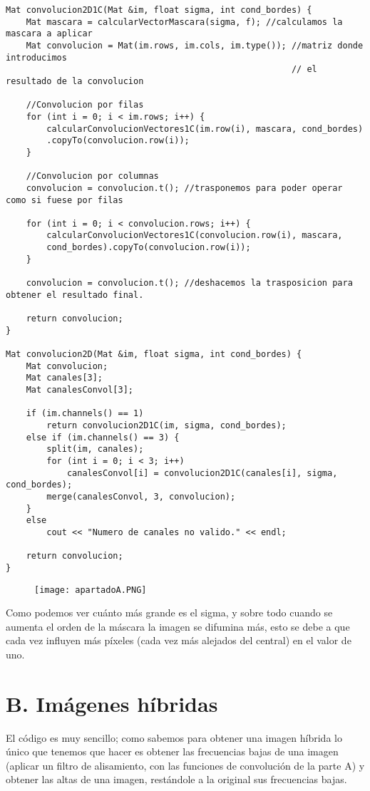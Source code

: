\documentclass[10pt,a4paper]{article}
\begin{document}
\begin{lstlisting}
Mat convolucion2D1C(Mat &im, float sigma, int cond_bordes) {
	Mat mascara = calcularVectorMascara(sigma, f); //calculamos la mascara a aplicar
	Mat convolucion = Mat(im.rows, im.cols, im.type()); //matriz donde introducimos
                                                        // el resultado de la convolucion

	//Convolucion por filas
	for (int i = 0; i < im.rows; i++) {
		calcularConvolucionVectores1C(im.row(i), mascara, cond_bordes)
		.copyTo(convolucion.row(i));
	}

	//Convolucion por columnas
	convolucion = convolucion.t(); //trasponemos para poder operar como si fuese por filas

	for (int i = 0; i < convolucion.rows; i++) {
		calcularConvolucionVectores1C(convolucion.row(i), mascara, 
		cond_bordes).copyTo(convolucion.row(i));
	}

	convolucion = convolucion.t(); //deshacemos la trasposicion para obtener el resultado final.

	return convolucion;
}

Mat convolucion2D(Mat &im, float sigma, int cond_bordes) {
	Mat convolucion;
	Mat canales[3];
	Mat canalesConvol[3];

	if (im.channels() == 1)
		return convolucion2D1C(im, sigma, cond_bordes);
	else if (im.channels() == 3) {
		split(im, canales);
		for (int i = 0; i < 3; i++)
			canalesConvol[i] = convolucion2D1C(canales[i], sigma, cond_bordes);
		merge(canalesConvol, 3, convolucion);
	}
	else
		cout << "Numero de canales no valido." << endl;

	return convolucion;
}
\end{lstlisting}

\begin{figure}[H]
\centering
\texttt{[image: apartadoA.PNG]}
\end{figure}

Como podemos ver cuánto más grande es el sigma, y sobre todo cuando se aumenta el orden de la máscara la imagen se difumina más, esto se debe a que cada vez influyen más píxeles (cada vez más alejados del central) en el valor de uno.\\

\section*{B. Imágenes híbridas}

El código es muy sencillo; como sabemos para obtener una imagen híbrida lo único que tenemos que hacer es obtener las frecuencias bajas de una imagen (aplicar un filtro de alisamiento, con las funciones de convolución de la parte A) y obtener las altas de una imagen, restándole a la original sus frecuencias bajas.\\
\end{document}
